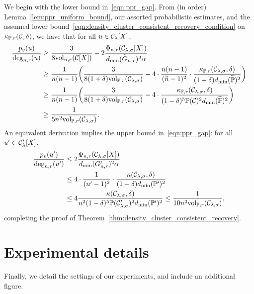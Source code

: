 We begin with the lower bound in~\eqref{eqn:ppr_gap}. From (in order) Lemma~\ref{lem:ppr_uniform_bound}, our assorted probabilistic estimates, and the assumed lower bound~\eqref{eqn:density_cluster_consistent_recovery_condition} on $\kappa_{\mathbb{P},r}(\mathcal{C},\delta)$, we have that for all $u \in \mathcal{C}_{\lambda}[X]$,
\begin{align*}
\frac{p_v(u)}{\deg_{n,r}(u)} & \geq \frac{3}{8\mathrm{vol}_{n,r}(\mathcal{C}[X])} - 2\frac{\Phi_{n,r}(\mathcal{C}_{\lambda,\sigma}[X])}{d_{\min}(\widetilde{G}_{n,r})^2 \alpha} \\
& \geq \frac{1}{n(n - 1)}\biggl(\frac{3}{8(1 + \delta)\mathrm{vol}_{\mathbb{P},r}(\mathcal{C}_{\lambda,\sigma})} - 4 \cdot \frac{n(n - 1)}{(\widetilde{n} - 1)^2} \cdot \frac{\kappa_{\mathbb{P},r}(\mathcal{C}_{\lambda,\sigma},\delta)}{(1 - \delta) d_{\min}(\widetilde{\mathbb{P}})^2}\biggr) \\
& \geq \frac{1}{n(n - 1)}\biggl(\frac{3}{8(1 + \delta)\mathrm{vol}_{\mathbb{P},r}(\mathcal{C}_{\lambda,\sigma})} - 4 \cdot \frac{\kappa_{\mathbb{P},r}(\mathcal{C}_{\lambda,\sigma},\delta)}{(1 - \delta)^5 \mathbb{P}(\mathcal{C})^2 d_{\min}(\widetilde{\mathbb{P}})^2}\biggr) \\
& \geq \frac{1}{5 n^2\mathrm{vol}_{\mathbb{P},r}(\mathcal{C}_{\lambda,\sigma})}.
\end{align*}
An equivalent derivation implies the upper bound in~\eqref{eqn:ppr_gap}: for all $u' \in \mathcal{C}_{\lambda}'[X]$,
\begin{align*}
\frac{p_v(u')}{\deg_{n,r}(u')} & \leq 2 \frac{\Phi_{n,r}(\mathcal{C}_{\lambda,\sigma}[X])}{d_{\min}(G_{n,r}')^2 \alpha} \\
& \leq 4 \cdot \frac{1}{(n' - 1)^2} \cdot \frac{ \kappa(\mathcal{C}_{\lambda,\sigma},\delta)}{(1 - \delta) d_{\min}(\mathbb{P}')^2} \\
& \leq 4\frac{ \kappa(\mathcal{C}_{\lambda,\sigma},\delta)}{n^2 (1 - \delta)^5 \mathbb{P}(\mathcal{C}_{\lambda,\sigma}')^2 d_{\min}(\mathbb{P}')^2} \leq \frac{1}{10 n^2\mathrm{vol}_{\mathbb{P},r}(\mathcal{C}_{\lambda,\sigma})},
\end{align*}
completing the proof of Theorem~\ref{thm:density_cluster_consistent_recovery}.

\section{Experimental details}
\label{apdx:experimental_details}
Finally, we detail the settings of our experiments, and include an additional figure.

